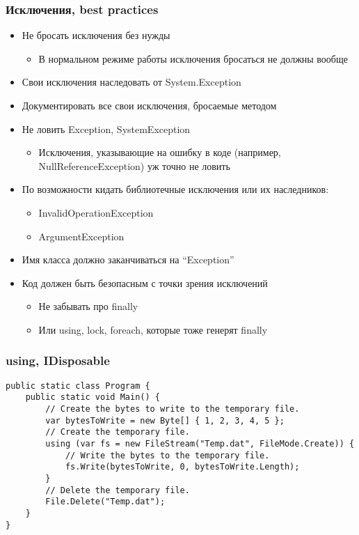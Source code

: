 \documentclass[xetex,mathserif,serif]{beamer}
\begin{document}
    \begin{frame}
        \frametitle{Исключения, best practices}
        \begin{itemize}
            \item Не бросать исключения без нужды
            \begin{itemize}
                \item В нормальном режиме работы исключения бросаться не должны вообще
            \end{itemize}
            \item Свои исключения наследовать от System.Exception
            \item Документировать все свои исключения, бросаемые методом
            \item Не ловить Exception, SystemException
            \begin{itemize}
                \item Исключения, указывающие на ошибку в коде (например, NullReferenceException) уж точно не ловить
            \end{itemize}
            \item По возможности кидать библиотечные исключения или их наследников:
            \begin{itemize}
                \item InvalidOperationException
                \item ArgumentException
            \end{itemize}
            \item Имя класса должно заканчиваться на ``Exception''
            \item Код должен быть безопасным с точки зрения исключений
            \begin{itemize}
                \item Не забывать про finally 
                \item Или using, lock, foreach, которые тоже генерят finally
            \end{itemize}
        \end{itemize}
    \end{frame}

    \begin{frame}[fragile]
        \frametitle{using, IDisposable}
        \begin{small}
            \begin{verbatim}
public static class Program {
    public static void Main() {
        // Create the bytes to write to the temporary file.
        var bytesToWrite = new Byte[] { 1, 2, 3, 4, 5 };
        // Create the temporary file.
        using (var fs = new FileStream("Temp.dat", FileMode.Create)) {
            // Write the bytes to the temporary file.
            fs.Write(bytesToWrite, 0, bytesToWrite.Length);
        }
        // Delete the temporary file.
        File.Delete("Temp.dat");
    }
}
            \end{verbatim}
        \end{small}
    \end{frame}
\end{document}
